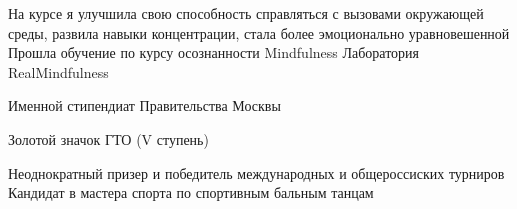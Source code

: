 \documentclass[]{awesome-cv}
\begin{document}
\begin{cventries}
	\cventry
	{\qquad \bullet На курсе я улучшила свою способность справляться с вызовами окружающей среды, развила навыки концентрации, стала более эмоционально уравновешенной}
	{Прошла обучение по курсу осознанности Mindfulness }
	{Лаборатория RealMindfulness}
	{}
	{}
	\end{cventries} 
		\vspace{-7mm}\begin{cventries}
	\cventry 
	{}
	{Именной стипендиат Правительства Москвы}
	{}{}{}
		\end{cventries}  \vspace{-11mm} \begin{cventries}
	\cventry	
	{}
	{Золотой значок ГТО (V ступень)}
	{}
	{}
	{}
		\end{cventries}  \vspace{-11mm} \begin{cventries}
	\cventry
	{\qquad Неоднократный призер и победитель международных и общероссиских турниров}
	{Кандидат в мастера спорта по спортивным бальным танцам}
	{}
	{}
	{}
	\end{cventries} \vspace{-10mm}
\end{document}
